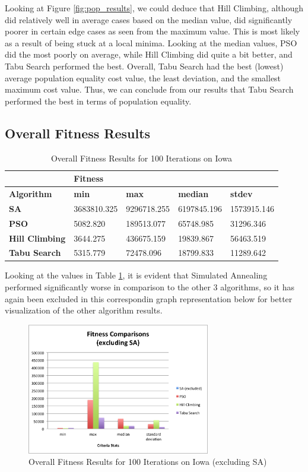 \documentclass[journal]{IEEEtran}
\begin{document}
Looking at Figure \ref{fig:pop_results}, we could deduce that Hill Climbing, although did relatively well in average cases based on the median value, did significantly poorer in certain edge cases as seen from the maximum value. This is most likely as a result of being stuck at a local minima. Looking at the median values, PSO did the most poorly on average, while Hill Climbing did quite a bit better, and Tabu Search performed the best. Overall, Tabu Search had the best (lowest) average population equality cost value, the least deviation, and the smallest maximum cost value. Thus, we can conclude from our results that Tabu Search performed the best in terms of population equality.

\subsection{Overall Fitness Results}

\begin{table}[!h]
\centering
\caption{Overall Fitness Results for 100 Iterations on Iowa}
\label{tab:fitness_100iter}
\begin{tabular}{l|llll}
                       & \multicolumn{4}{l}{\textbf{Fitness}}                          \\ \hline
\textbf{Algorithm}     & \textbf{min} & \textbf{max} & \textbf{median} & \textbf{stdev} \\ \hline
\textbf{SA}            & 3683810.325  & 9296718.255  & 6197845.196     & 1573915.146    \\
\textbf{PSO}           & 5082.820     & 189513.077   & 65748.985       & 31296.346      \\
\textbf{Hill Climbing} & 3644.275     & 436675.159   & 19839.867       & 56463.519      \\
\textbf{Tabu Search}   & 5315.779     & 72478.096    & 18799.833       & 11289.642     
\end{tabular}
\end{table}

Looking at the values in Table \ref{tab:fitness_100iter}, it is evident that Simulated Annealing performed significantly worse in comparison to the other 3 algorithms, so it has again been excluded in this correspondin graph representation below for better visualization of the other algorithm results. 

\begin{figure}[h!]
    \includegraphics[width=8cm]{images/fitness_graph.png}
    \centering
    \caption{Overall Fitness Results for 100 Iterations on Iowa (excluding SA)}
    \label{fig:fitness_results}
\end{figure}
\end{document}
